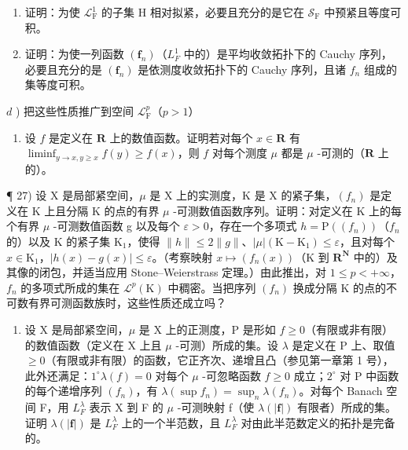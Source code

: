 \begin{enumerate}
\def\labelenumi{\alph{enumi})}
\setcounter{enumi}{1}
\item
  证明：为使 \(\mathcal{L}_{\mathrm{F}}^{1}\) 的子集 H 相对拟紧，必要且充分的是它在 \(\mathcal{S}_{\mathrm{F}}\) 中预紧且等度可积。
\item
  证明：为使一列函数 \((\mathbf{f}_{n})\)（\(L_{F}^{1}\) 中的）是平均收敛拓扑下的 Cauchy 序列，必要且充分的是 \((\mathbf{f}_{n})\) 是依测度收敛拓扑下的 Cauchy 序列，且诸 \(f_{n}\) 组成的集等度可积。
\end{enumerate}

\(d\) ) 把这些性质推广到空间 \(\mathcal{L}_{\mathrm{F}}^{p}\)（\(p > 1\)）

\begin{enumerate}
\def\labelenumi{\arabic{enumi})}
\setcounter{enumi}{25}
\tightlist
\item
  设 \(f\) 是定义在 \(\mathbf{R}\) 上的数值函数。证明若对每个 \(x \in \mathbf{R}\) 有 \(\liminf_{y \to x, y \geqslant x} f(y) \geqslant f(x)\)，则 \(f\) 对每个测度 \(\mu\) 都是 \(\mu\) -可测的（\(\mathbf{R}\) 上的）。
\end{enumerate}

¶ 27) 设 X 是局部紧空间，\(\mu\) 是 X 上的实测度，K 是 X 的紧子集，\((f_n)\) 是定义在 K 上且分隔 K 的点的有界 \(\mu\) -可测数值函数序列。证明：对定义在 K 上的每个有界 \(\mu\) -可测数值函数 g 以及每个 \(\varepsilon > 0\)，存在一个多项式 \(h = \mathrm{P}((f_n))\)（\(f_n\) 的）以及 K 的紧子集 \(\mathrm{K}_1\)，使得 \(\|h\| \leqslant 2\|g\|\)、\(|\mu|(\mathrm{K} - \mathrm{K}_1) \leqslant \varepsilon\)，且对每个 \(x \in \mathrm{K}_1\)，\(|h(x) - g(x)| \leqslant \varepsilon\)。（考察映射 \(x \mapsto (f_n(x))\)（K 到 \(\mathbf{R}^{\mathbf{N}}\) 中的）及其像的闭包，并适当应用 Stone--Weierstrass 定理。）由此推出，对 \(1 \leqslant p < +\infty\)，\(f_n\) 的多项式所成的集在 \(\mathcal{L}^p(\mathrm{K})\) 中稠密。当把序列 \((f_n)\) 换成分隔 K 的点的不可数有界可测函数族时，这些性质还成立吗？

\begin{enumerate}
\def\labelenumi{\arabic{enumi})}
\setcounter{enumi}{27}
\tightlist
\item
  设 X 是局部紧空间，\(\mu\) 是 X 上的正测度，P 是形如 \(f \geqslant 0\)（有限或非有限）的数值函数（定义在 X 上且 \(\mu\) -可测）所成的集。设 \(\lambda\) 是定义在 P 上、取值 \(\geqslant 0\)（有限或非有限）的函数，它正齐次、递增且凸（参见第一章第 1 号），此外还满足：\(1^{\circ} \lambda(f) = 0\) 对每个 \(\mu\) -可忽略函数 \(f \geqslant 0\) 成立；\(2^{\circ}\) 对 P 中函数的每个递增序列 \((f_{n})\)，有 \(\lambda(\sup f_{n}) = \sup_{n} \lambda(f_{n})\)。对每个 Banach 空间 F，用 \(L_{F}^{\lambda}\) 表示 X 到 F 的 \(\mu\) -可测映射 f（使 \(\lambda(|\mathbf{f}|)\) 有限者）所成的集。证明 \(\lambda(|\mathbf{f}|)\) 是 \(L_{F}^{\lambda}\) 上的一个半范数，且 \(L_{F}^{\lambda}\) 对由此半范数定义的拓扑是完备的。
\end{enumerate}

